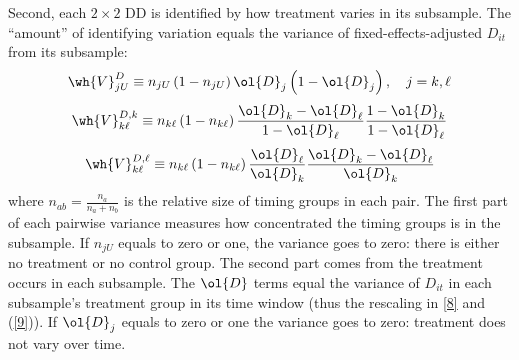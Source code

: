 \documentclass[12pt]{article}
\newcommand{\highlightP}[1]{{\emph{\color{MyPink}{#1}}}}
\theoremstyle{definition}
\begin{document}
Second, each $2 \times 2$ DD is identified by how treatment varies in its subsample. The ``amount'' of identifying variation equals the variance of fixed-effects-adjusted $D_{it}$ from its subsample:
\begin{equation}
    \label{7}
    \wh{V}_{j U}^D \equiv n_{j U}\left(1-n_{j U}\right) \ol{D}_j\left(1-\ol{D}_j\right), \quad j=k, \ell
\end{equation}
\begin{equation}
    \label{8}
    \wh{V}_{k \ell}^{D, k} \equiv n_{k \ell}\left(1-n_{k \ell}\right) \frac{\ol{D}_k-\ol{D}_{\ell}}{1-\ol{D}_{\ell}} \frac{1-\ol{D}_k}{1-\ol{D}_{\ell}}
\end{equation}
\begin{equation}
    \label{9}
    \wh{V}_{k \ell}^{D, \ell} \equiv n_{k \ell}\left(1-n_{k \ell}\right) \frac{\ol{D}_{\ell}}{\ol{D}_k} \frac{\ol{D}_k-\ol{D}_{\ell}}{\ol{D}_k}
\end{equation}
where $n_{ab} = \frac{n_a}{n_a + n_b}$ is the relative size of timing groups in each pair. The first part of each pairwise variance measures how concentrated the timing groups is in the subsample. If $n_{jU}$ equals to zero or one, the variance goes to zero: there is either no treatment or no control group. The second part comes from \highlightP{when} the treatment occurs in each subsample. The $\ol{D}$ terms equal the variance of $D_{it}$ in each subsample's treatment group in its time window (thus the rescaling in \ref{8} and (\ref{9})). If $\ol{D}_j$ equals to zero or one the variance goes to zero: treatment does not vary over time.
\end{document}
